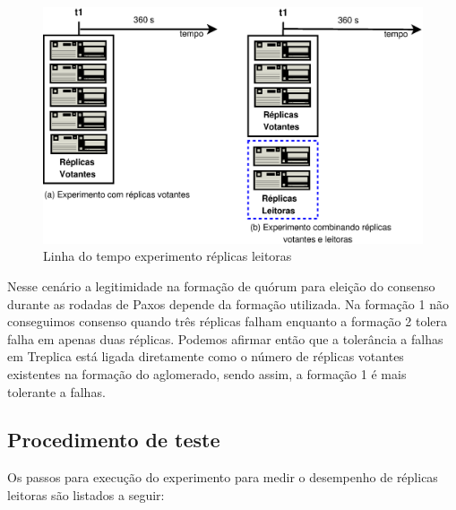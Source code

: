 \begin{figure}[ht]
  \centering
  \includegraphics[width=14cm]{conteudo/capitulos/figuras/timeline_exp_leitora.eps}
  \caption{Linha do tempo experimento réplicas leitoras}
  \label{fig:timeline_exp_leitora}
\end{figure}

Nesse cenário a legitimidade na formação de quórum para eleição do consenso durante as
rodadas de Paxos depende da formação utilizada. Na formação 1 não conseguimos consenso
quando três réplicas falham enquanto a formação 2 tolera falha em apenas duas réplicas.
Podemos afirmar então que a tolerância a falhas em Treplica está ligada diretamente como o
número de réplicas votantes existentes na formação do aglomerado, sendo assim, a formação
1 é mais tolerante a falhas.

\subsection{Procedimento de teste}\label{subsec:procedimento_teste_leitora}

Os passos para execução do experimento para medir o desempenho de réplicas leitoras são
listados a seguir:

